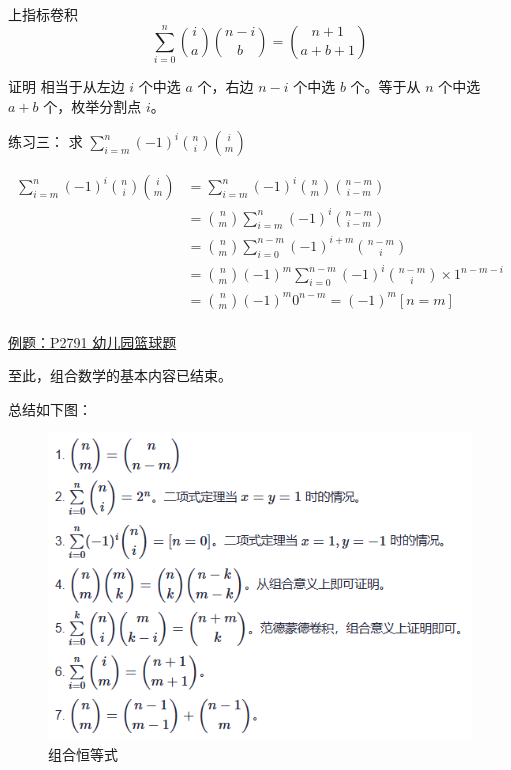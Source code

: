 \documentclass[UTF8]{beamer}
\begin{document}
    \begin{frame}
      \begin{block}{上指标卷积}\label{ux4e0aux6307ux6807ux5377ux79ef}
      \[
      \sum\limits_{i=0}^{n}{i \choose a}{n-i \choose b}={n+1 \choose a+b+1}
      \]
      \end{block}
      \pause
      证明
      相当于从左边 \(i\) 个中选 \(a\) 个，右边 \(n-i\) 个中选 \(b\) 个。等于从
      \(n\) 个中选 \(a+b\) 个，枚举分割点 \(i\)。
    \end{frame}
    \begin{frame}
      \begin{block}{练习三：}\label{ux7ec3ux4e60ux4e09}
      求 \(\sum\limits_{i=m}^{n}(-1)^i{n \choose i}{i \choose m}\)
      \end{block}
      \vspace{-1em}
      \pause
      \[
      \begin{aligned}
      \sum\limits_{i=m}^{n}(-1)^i{n \choose i}{i \choose m}&=\sum\limits_{i=m}^{n}(-1)^i{n \choose m}{n-m \choose i-m} \\
      &={n \choose m}\sum\limits_{i=m}^{n}(-1)^i{n-m \choose i-m} \\
      &={n \choose m}\sum\limits_{i=0}^{n-m}(-1)^{i+m}{n-m \choose i} \\
      &={n \choose m}(-1)^m\sum\limits_{i=0}^{n-m}(-1)^{i}{n-m \choose i}\times 1^{n-m-i} \\
      &={n \choose m}(-1)^m 0^{n-m}=(-1)^m[n=m] \\
      \end{aligned}
      \]
    \end{frame}
    
    \begin{frame}
      \href{https://www.luogu.com.cn/problem/P2791}{例题：P2791 幼儿园篮球题}

      至此，组合数学的基本内容已结束。

      总结如下图：
    \end{frame}

    \begin{frame}
      \begin{figure}
        \centering
        \includegraphics[scale=0.55]{image1.png}
        \caption{组合恒等式}
      \end{figure}
    \end{frame}
\end{document}
